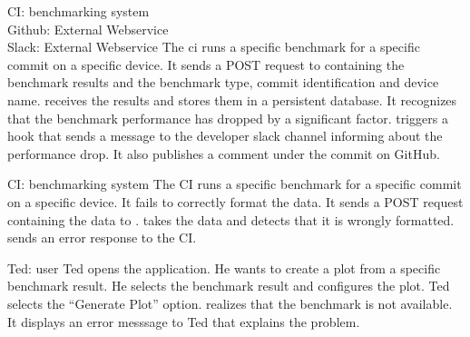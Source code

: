{CI: \Gls{benchmarking system} \\ Github: External Webservice \\ Slack: External Webservice}
{The \acrshort{ci} runs a specific \gls{benchmark} for a specific commit on a specific device. It sends a POST request to \parkview{} containing the \glspl{benchmark result} and the benchmark type, commit identification and device name. \parkview{} receives the results and stores them in a persistent database. It recognizes that the \gls{benchmark performance} has dropped by a significant factor. \parkview{} triggers a hook that sends a message to the developer slack channel informing about the performance drop. It also publishes a comment under the commit on GitHub.}

{CI: \Gls{benchmarking system}}
{The CI runs a specific \gls{benchmark} for a specific commit on a specific device. It fails to correctly format the data. It sends a POST request containing the data to \parkview{}. \parkview{} takes the data and detects that it is wrongly formatted. \parkview{} sends an \gls{error response} to the CI.}

{Ted: \Gls{user}}
{Ted opens the application. He wants to create a \gls{plot} from a specific \gls{benchmark result}. He selects the \gls{benchmark result} and configures the \gls{plot}. Ted selects the \enquote{Generate Plot} option. \parkview{} realizes that the \gls{benchmark} is not available. It displays an error messsage to Ted that explains the problem.}

